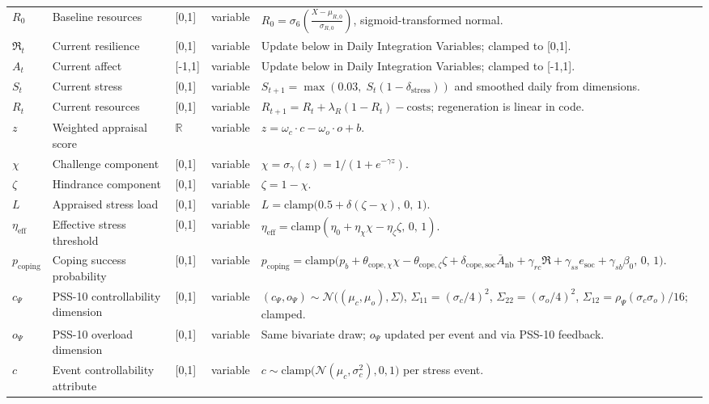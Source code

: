 \documentclass[
  letterpaper,
  DIV=11,
  numbers=noendperiod]{scrartcl}
\begin{document}
\begin{longtable}{lp{2.4cm}p{1.6cm}p{1.7cm}p{5.2cm}}
$R_0$ & Baseline resources & [0,1] & variable & $R_0 = \sigma_6\left(\frac{X - \mu_{R,0}}{\sigma_{R,0}}\right)$, sigmoid-transformed normal. \\
$\mathfrak{R}_t$ & Current resilience & [0,1] & variable & Update below in Daily Integration Variables; clamped to [0,1]. \\
$A_t$ & Current affect & [-1,1] & variable & Update below in Daily Integration Variables; clamped to [-1,1]. \\
$S_t$ & Current stress & [0,1] & variable & $S_{t+1} = \max(0.03,\; S_t (1 - \delta_{\mathrm{stress}}))$ and smoothed daily from dimensions. \\
$R_t$ & Current resources & [0,1] & variable & $R_{t+1} = R_t + \lambda_R (1 - R_t) - \text{costs}$; regeneration is linear in code. \\
$z$ & Weighted appraisal score & $\mathbb{R}$ & variable & $z = \omega_c \cdot c - \omega_o \cdot o + b$. \\
$\chi$ & Challenge component & [0,1] & variable & $\chi = \sigma_\gamma(z) = 1/(1 + e^{-\gamma z})$. \\
$\zeta$ & Hindrance component & [0,1] & variable & $\zeta = 1 - \chi$. \\
$L$ & Appraised stress load & [0,1] & variable & $L = \mathrm{clamp}\big(0.5 + \delta(\zeta - \chi),\, 0,\, 1\big)$. \\
$\eta_{\mathrm{eff}}$ & Effective stress threshold & [0,1] & variable & $\eta_{\mathrm{eff}} = \mathrm{clamp}(\eta_0 + \eta_\chi \chi - \eta_\zeta \zeta,\, 0,\, 1)$. \\
$p_{\mathrm{coping}}$ & Coping success probability & [0,1] & variable & $p_{\mathrm{coping}} = \mathrm{clamp}\big(p_b + \theta_{\mathrm{cope},\chi}\chi - \theta_{\mathrm{cope},\zeta}\zeta + \delta_{\mathrm{cope,soc}}\bar{A}_{\mathrm{nb}} + \gamma_{rc}\mathfrak{R} + \gamma_{ss}e_{\mathrm{soc}} + \gamma_{sb}\beta_0,\, 0,\, 1\big)$. \\
$c_\Psi$ & PSS-10 controllability dimension & [0,1] & variable & $(c_\Psi, o_\Psi) \sim \mathcal{N}\big((\mu_c,\mu_o), \Sigma\big)$, $\Sigma_{11} = (\sigma_c/4)^2$, $\Sigma_{22} = (\sigma_o/4)^2$, $\Sigma_{12} = \rho_\Psi (\sigma_c\sigma_o)/16$; clamped. \\
$o_\Psi$ & PSS-10 overload dimension & [0,1] & variable & Same bivariate draw; $o_\Psi$ updated per event and via PSS-10 feedback. \\
$c$ & Event controllability attribute & [0,1] & variable & $c \sim \mathrm{clamp}\big(\mathcal{N}(\mu_c, \sigma_c^2), 0, 1\big)$ per stress event. \\

\end{longtable}
\end{document}
